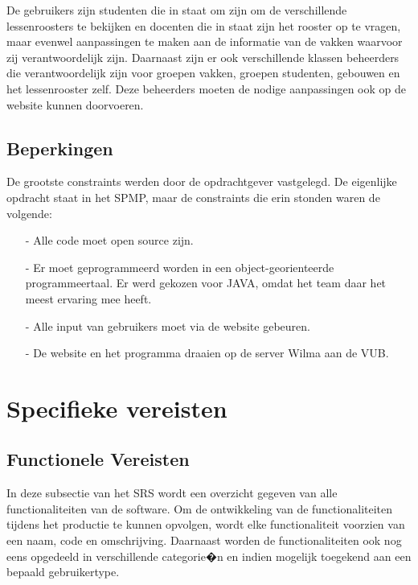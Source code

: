 \documentclass{article}
\begin{document}
De gebruikers zijn studenten die in staat om zijn om de verschillende lessenroosters te bekijken en docenten die in staat zijn het rooster op te vragen, maar evenwel aanpassingen te maken aan de informatie van de vakken waarvoor zij verantwoordelijk zijn.
Daarnaast zijn er ook verschillende klassen beheerders die verantwoordelijk zijn voor groepen vakken, groepen studenten, gebouwen en het lessenrooster zelf. Deze beheerders moeten de nodige aanpassingen ook op de website kunnen doorvoeren.

\subsection{Beperkingen}

De grootste constraints werden door de opdrachtgever vastgelegd. De eigenlijke opdracht staat in het SPMP, maar de constraints die erin stonden waren de volgende:
\begin{itemize}
	\item[-] Alle code moet open source zijn.\\
	\item[-] Er moet geprogrammeerd worden in een object-georienteerde programmeertaal. Er werd gekozen voor JAVA, omdat het team daar het meest ervaring mee heeft.\\
	\item[-] Alle input van gebruikers moet via de website gebeuren. \\
	\item[-] De website en het programma draaien op de server Wilma aan de VUB. \\
\end{itemize}


\newpage

\section{Specifieke vereisten}

\subsection{Functionele Vereisten}

In deze subsectie van het SRS  wordt een overzicht gegeven van alle functionaliteiten van de software. Om de ontwikkeling van de functionaliteiten tijdens het productie te kunnen opvolgen, wordt elke functionaliteit voorzien van een naam, code en omschrijving. Daarnaast worden de functionaliteiten ook nog eens opgedeeld in verschillende categorie�n en indien mogelijk toegekend aan een bepaald gebruikertype.
\end{document}
